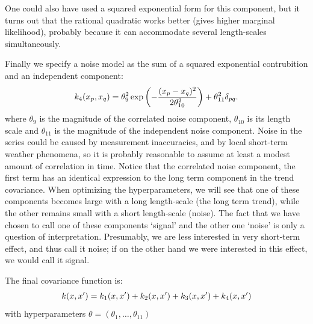 \documentclass[letterpaper,10pt,english]{sphinxmanual}
\begin{document}
One could also have used a squared exponential form for this component,
but it turns out that the rational quadratic works better (gives higher marginal
likelihood), probably because it can accommodate several length-scales simultaneously.

Finally we specify a noise model as the sum of a squared exponential contrubition and an independent component:
\begin{gather}
\begin{split}k_4(x_p,x_q) = \theta_9^2\exp\left(-\frac{(x_p - x_q)^2}{2\theta_{10}^2}\right) + \theta_{11}^2\delta_{pq}.\end{split}\notag
\end{gather}
where $\theta_9$ is the magnitude of the correlated noise component, $\theta_{10}$
is its length scale and $\theta_{11}$ is the magnitude of the independent noise component. Noise in
the series could be caused by measurement inaccuracies, and by local short-term
weather phenomena, so it is probably reasonable to assume at least a modest
amount of correlation in time. Notice that the correlated noise component, the
first term has an identical expression to the long term component
in the trend covariance. When optimizing the hyperparameters, we will see that one of
these components becomes large with a long length-scale (the long term trend),
while the other remains small with a short length-scale (noise). The fact that
we have chosen to call one of these components ‘signal’ and the other one ‘noise’
is only a question of interpretation. Presumably, we are less interested in very
short-term effect, and thus call it noise; if on the other hand we were interested
in this effect, we would call it signal.

The final covariance function is:
\begin{gather}
\begin{split}k(x,x') = k_1(x,x') + k_2(x,x') + k_3(x,x') + k_4(x,x')\end{split}\notag
\end{gather}
with hyperparameters $\theta = (\theta_1,\ldots,\theta_{11})$
\end{document}

